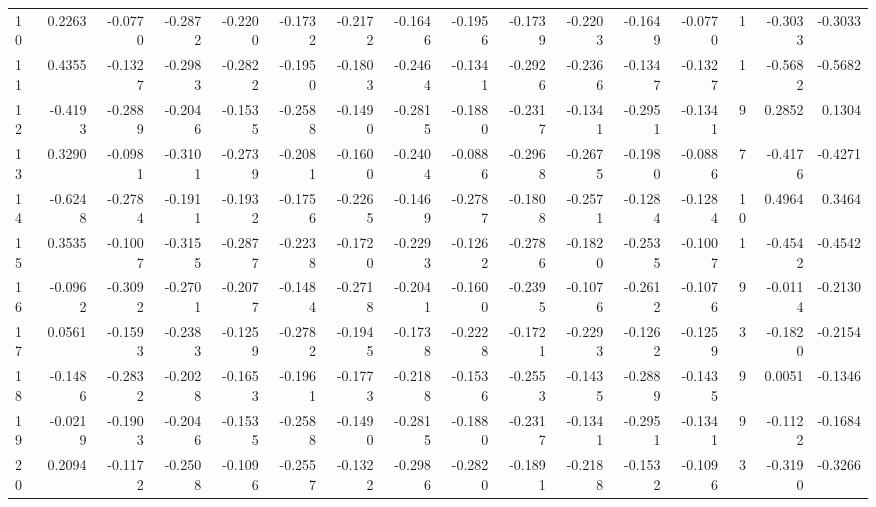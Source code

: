 \begin{tabular}{lrrrrrrrrrrrrrrr}
10  &      0.2263 & -0.0770 & -0.2872 & -0.2200 & -0.1732 & -0.2172 & -0.1646 & -0.1956 & -0.1739 & -0.2203 &  -0.1649 &    -0.0770 &      1 &                   -0.3033 &                    -0.3033 \\
11  &      0.4355 & -0.1327 & -0.2983 & -0.2822 & -0.1950 & -0.1803 & -0.2464 & -0.1341 & -0.2926 & -0.2366 &  -0.1347 &    -0.1327 &      1 &                   -0.5682 &                    -0.5682 \\
12  &     -0.4193 & -0.2889 & -0.2046 & -0.1535 & -0.2588 & -0.1490 & -0.2815 & -0.1880 & -0.2317 & -0.1341 &  -0.2951 &    -0.1341 &      9 &                    0.2852 &                     0.1304 \\
13  &      0.3290 & -0.0981 & -0.3101 & -0.2739 & -0.2081 & -0.1600 & -0.2404 & -0.0886 & -0.2968 & -0.2675 &  -0.1980 &    -0.0886 &      7 &                   -0.4176 &                    -0.4271 \\
14  &     -0.6248 & -0.2784 & -0.1911 & -0.1932 & -0.1756 & -0.2265 & -0.1469 & -0.2787 & -0.1808 & -0.2571 &  -0.1284 &    -0.1284 &     10 &                    0.4964 &                     0.3464 \\
15  &      0.3535 & -0.1007 & -0.3155 & -0.2877 & -0.2238 & -0.1720 & -0.2293 & -0.1262 & -0.2786 & -0.1820 &  -0.2535 &    -0.1007 &      1 &                   -0.4542 &                    -0.4542 \\
16  &     -0.0962 & -0.3092 & -0.2701 & -0.2077 & -0.1484 & -0.2718 & -0.2041 & -0.1600 & -0.2395 & -0.1076 &  -0.2612 &    -0.1076 &      9 &                   -0.0114 &                    -0.2130 \\
17  &      0.0561 & -0.1593 & -0.2383 & -0.1259 & -0.2782 & -0.1945 & -0.1738 & -0.2228 & -0.1721 & -0.2293 &  -0.1262 &    -0.1259 &      3 &                   -0.1820 &                    -0.2154 \\
18  &     -0.1486 & -0.2832 & -0.2028 & -0.1653 & -0.1961 & -0.1773 & -0.2188 & -0.1536 & -0.2553 & -0.1435 &  -0.2889 &    -0.1435 &      9 &                    0.0051 &                    -0.1346 \\
19  &     -0.0219 & -0.1903 & -0.2046 & -0.1535 & -0.2588 & -0.1490 & -0.2815 & -0.1880 & -0.2317 & -0.1341 &  -0.2951 &    -0.1341 &      9 &                   -0.1122 &                    -0.1684 \\
20  &      0.2094 & -0.1172 & -0.2508 & -0.1096 & -0.2557 & -0.1322 & -0.2986 & -0.2820 & -0.1891 & -0.2188 &  -0.1532 &    -0.1096 &      3 &                   -0.3190 &                    -0.3266 \\

\end{tabular}

